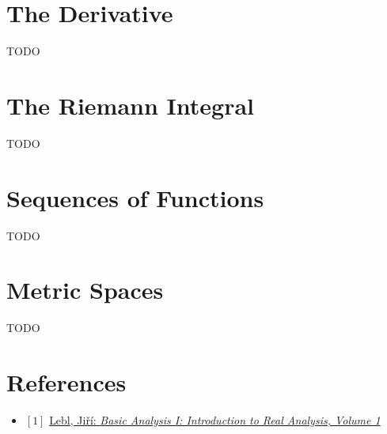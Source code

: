 \documentclass[12pt, letterpaper, oneside]{book}
\begin{document}
%
%

\chapter{The Derivative}

TODO

%
%

\chapter{The Riemann Integral}

TODO

%
%

\chapter{Sequences of Functions}

TODO

%
%

\chapter{Metric Spaces}

TODO

%
%

\chapter*{References}

\begin{itemize}
  \item $[1]$ \href{https://ocw.mit.edu/courses/18-100a-real-analysis-fall-2020/resources/mit18_100af20_basic_analysis/}{Lebl, Jiří: \it{Basic Analysis I: Introduction to Real Analysis, Volume 1}}
\end{itemize}
\end{document}
